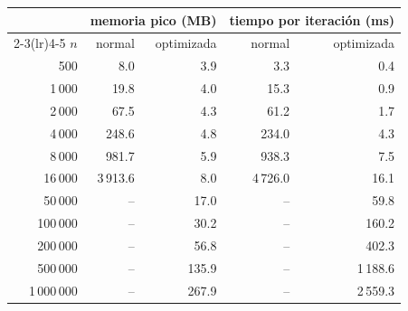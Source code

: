 \begin{tabular}{rrrrr}
\toprule
 & \multicolumn{2}{c}{memoria pico (MB)} & \multicolumn{2}{c}{tiempo por iteración (ms)} \\
\cmidrule(lr){2-3}\cmidrule(lr){4-5}
$n$ & normal & optimizada & normal & optimizada \\
\midrule
500 & 8.0 & 3.9 & 3.3 & 0.4 \\
1\,000 & 19.8 & 4.0 & 15.3 & 0.9 \\
2\,000 & 67.5 & 4.3 & 61.2 & 1.7 \\
4\,000 & 248.6 & 4.8 & 234.0 & 4.3 \\
8\,000 & 981.7 & 5.9 & 938.3 & 7.5 \\
16\,000 & 3\,913.6 & 8.0 & 4\,726.0 & 16.1 \\
50\,000 & -- & 17.0 & -- & 59.8 \\
100\,000 & -- & 30.2 & -- & 160.2 \\
200\,000 & -- & 56.8 & -- & 402.3 \\
500\,000 & -- & 135.9 & -- & 1\,188.6 \\
1\,000\,000 & -- & 267.9 & -- & 2\,559.3 \\
\bottomrule
\end{tabular}
